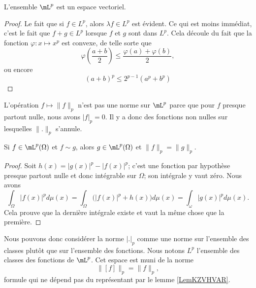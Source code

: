 \begin{lemma}
    L'ensemble \( \mL^p\) est un espace vectoriel.
\end{lemma}

\begin{proof}
    Le fait que si \( f\in L^p\), alors \( \lambda f\in L^p\) est évident. Ce qui est moins immédiat, c'est le fait que \( f+g\in L^p\) lorsque \( f\) et \( g\) sont dans \( L^p\). Cela découle du fait que la fonction \( \varphi\colon x\mapsto x^p\) est convexe, de telle sorte que
    \begin{equation}
        \varphi\left( \frac{ a+b }{2} \right)\leq\frac{ \varphi(a)+\varphi(b) }{2},
    \end{equation}
    ou encore
    \begin{equation}    \label{EqZFSduFa}
        (a+b)^p\leq 2^{p-1}(a^p+b^p)
    \end{equation}
\end{proof}

    L'opération \( f\mapsto \| f \|_p\) n'est pas une norme sur \( \mL^p\) parce que pour \( f\) presque partout nulle, nous avons \( | f |_p=0\). Il y a donc des fonctions non nulles sur lesquelles \( \| . \|_p\) s'annule.

\begin{lemma}       \label{LemKZVHVAR}
    Si \( f\in \mL^p(\Omega)\) et \( f\sim g\), alors \( g\in \mL^p(\Omega)\) et \( \| f \|_p=\| g \|_p\).
\end{lemma}

\begin{proof}
    Soit \( h(x)=| g(x) |^p-| f(x) |^p\); c'est une fonction par hypothèse presque partout nulle et donc intégrable sur \( \Omega\); son intégrale y vaut zéro. Nous avons
    \begin{equation}
        \int_{\Omega}| f(x) |^pd\mu(x)=\int_{\Omega}\Big( | f(x) |^p+h(x)\big)d\mu(x)=\int_{\omega}| g(x) |^pd\mu(x).
    \end{equation}
    Cela prouve que la dernière intégrale existe et vaut la même chose que la première.
\end{proof}

Nous pouvons donc considérer la norme \( | . |_p\) comme une norme sur l'ensemble des classes plutôt que sur l'ensemble des fonctions. Nous notons \( L^p\) l'ensemble des classes des fonctions de \(\mL^p\). Cet espace est muni de la norme
\begin{equation}
    \| [f] \|_p=\| f \|_p,
\end{equation}
formule qui ne dépend pas du représentant par le lemme \ref{LemKZVHVAR}.

